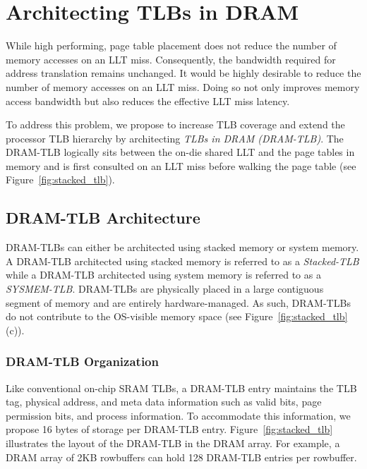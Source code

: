 \section{Architecting TLBs in DRAM } 
\label{sec:stackedTLB}

\noindent While high performing, page table placement does not reduce
the number of memory accesses on an LLT miss. Consequently, the
bandwidth required for address translation remains unchanged. It would
be highly desirable to reduce the number of memory accesses on an LLT
miss. Doing so not only improves memory access bandwidth but also
reduces the effective LLT miss latency.

To address this problem, we propose to increase TLB coverage and
extend the processor TLB hierarchy by architecting {\em TLBs in DRAM
(DRAM-TLB)}. The DRAM-TLB logically sits between the on-die shared LLT
and the page tables in memory and is first consulted on an LLT miss
before walking the page table (see Figure~\ref{fig:stacked_tlb}).


\subsection{DRAM-TLB Architecture}

\noindent DRAM-TLBs can either be architected using stacked memory or
system memory. A DRAM-TLB architected using stacked memory is referred
to as a {\em Stacked-TLB} while a DRAM-TLB architected using system
memory is referred to as a {\em SYSMEM-TLB}. DRAM-TLBs are physically
placed in a large contiguous segment of memory and are entirely
hardware-managed. As such, DRAM-TLBs do not contribute to the
OS-visible memory space (see Figure~\ref{fig:stacked_tlb}(c)).


\subsubsection{DRAM-TLB Organization}

\noindent Like conventional on-chip SRAM TLBs, a DRAM-TLB entry
maintains the TLB tag, physical address, and meta data information
such as valid bits, page permission bits, and process information. To
accommodate this information, we propose 16 bytes of storage per
DRAM-TLB entry. Figure~\ref{fig:stacked_tlb} illustrates the layout of
the DRAM-TLB in the DRAM array. For example, a DRAM array of 2KB
rowbuffers can hold 128 DRAM-TLB entries per rowbuffer.

